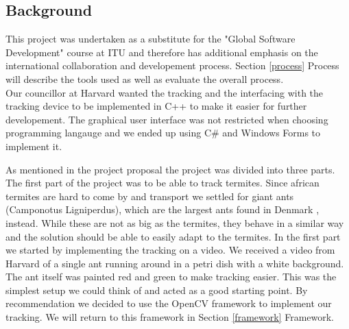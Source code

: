 
\subsection{Background}
\label{background}



This project was undertaken as a substitute for the "Global Software Development" course at ITU and therefore has additional emphasis on the international collaboration and developement process. Section \ref{process} Process will describe the tools used as well as evaluate the overall process. \\ 

Our councillor at Harvard wanted the tracking and the interfacing with the tracking device to be implemented in C++ to make it easier for further developement. The graphical user interface was not restricted when choosing programming langauge and we ended up using C\# and Windows Forms to implement it.

As mentioned in the project proposal the project was divided into three parts. The first part of the project was to be able to track termites. Since african termites are hard to come by and transport we settled for giant ants (Camponotus Ligniperdus), which are the largest ants found in Denmark \cite{fogn}, instead. While these are not as big as the termites, they behave in a similar way and the solution should be able to easily adapt to the termites. In the first part we started by implementing the tracking on a video. We received a video from Harvard of a single ant running around in a petri dish with a white background. The ant itself was painted red and green to make tracking easier. This was the simplest setup we could think of and acted as a good starting point. By recommendation we decided to use the OpenCV \cite{opencv} framework to implement our tracking. We will return to this framework in Section \ref{framework} Framework. \\

